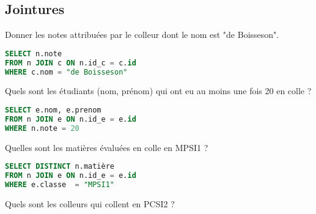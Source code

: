 \subsection{Jointures} 
\begin{Exercise}
Donner les notes attribuées par le colleur dont le nom est "de Boisseson".
\end{Exercise}
\begin{Answer}
\begin{lstlisting}[language=SQL]
SELECT n.note
FROM n JOIN c ON n.id_c = c.id
WHERE c.nom = "de Boisseson"
\end{lstlisting}
\end{Answer}
\begin{Exercise}
Quels sont les étudiants (nom, prénom) qui ont eu au moins une fois 20 en colle ?
\end{Exercise}
\begin{Answer}
\begin{lstlisting}[language=SQL]
SELECT e.nom, e.prenom
FROM n JOIN e ON n.id_e = e.id
WHERE n.note = 20
\end{lstlisting}
\end{Answer}
\begin{Exercise}
Quelles sont les matières évaluées en colle en MPSI1 ?
\end{Exercise}
\begin{Answer}
\begin{lstlisting}[language=SQL]
SELECT DISTINCT n.matière
FROM n JOIN e ON n.id_e = e.id
WHERE e.classe  = "MPSI1"
\end{lstlisting}
\end{Answer}
\begin{Exercise}
Quels sont les colleurs qui collent en PCSI2 ?
\end{Exercise}
